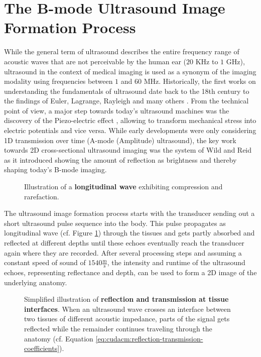 \section{The B-mode Ultrasound Image Formation Process}
\label{sec:cudacm:us-image-formation}

While the general term of ultrasound describes the entire frequency range of acoustic waves that are not perceivable by the human ear ($20$ KHz to $1$ GHz), ultrasound in the context of medical imaging is used as a synonym of the imaging modality using frequencies between $1$ and $60$ MHz.
Historically, the first works on understanding the fundamentals of ultrasound date back to the 18th century to the findings of Euler, Lagrange, Rayleigh and many others \cite{Cobbold:2007:UsFoundations,Brooks:2008:Ultrasound}.
From the technical point of view, a major step towards today's ultrasound machines was the discovery of the Piezo-electric effect \cite{Curie:1880:PiezoEffect}, allowing to transform mechanical stress into electric potentials and vice versa.
While early developments were only considering 1D transmission over time (A-mode (Amplitude) ultrasound), the key work towards 2D cross-sectional ultrasound imaging was the system of Wild and Reid \cite{Wild:1952:Application} as it introduced showing the amount of reflection as brightness and thereby shaping today's B-mode imaging.

\begin{figure}[ht]
	\centering
	
	\caption{
		Illustration of a \textbf{longitudinal wave} exhibiting compression and rarefaction.
	}
	\label{fig:cmvis:longitudinal-wave}
\end{figure}

The ultrasound image formation process starts with the transducer sending out a short ultrasound pulse sequence into the body.
This pulse propagates as longitudinal wave (cf. Figure \ref{fig:cmvis:longitudinal-wave}) through the tissues and gets partly absorbed and reflected at different depths until these echoes eventually reach the transducer again where they are recorded.
After several processing steps and assuming a constant speed of sound of $1540 \frac{\text{m}}{\text{s}}$, the intensity and runtime of the ultrasound echoes, representing reflectance and depth, can be used to form a 2D image of the underlying anatomy.

\begin{figure}[ht]
	\centering
	
	\caption{
		Simplified illustration of \textbf{reflection and transmission at tissue interfaces}.
		When an ultrasound wave crosses an interface between two tissues of different acoustic impedance, parts of the signal gets reflected while the remainder continues traveling through the anatomy (cf. Equation \ref{eq:cudacm:reflection-transmission-coefficients}).
	}
	\label{fig:cmvis:transducer-reflection}
\end{figure}

